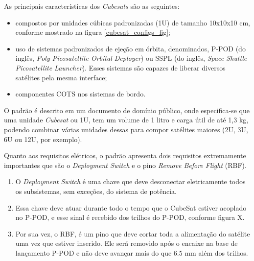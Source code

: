 As principais características dos \textit{Cubesats} são as seguintes:
\begin{itemize}
    \item compostos por unidades cúbicas padronizadas (1U) de tamanho 10x10x10 cm, conforme mostrado na figura \ref{cubesat_configs_fig};
    \item uso de sistemas padronizados de ejeção em órbita, denominados, P-POD (do inglês, \textit{Poly Picosatellite Orbital Deployer}) ou SSPL (do inglês, \textit{Space Shuttle Picosatellite Launcher}). Esses sistemas são capazes de liberar diversos satélites pela mesma interface;
    \item componentes COTS nos sistemas de bordo.
\end{itemize}

\noindent
\begin{minipage}{\linewidth}
\label{cubesat_configs_fig}
\end{minipage}

O padrão é descrito em um documento de domínio público\cite{cubesat_specs_rev13}, onde especifica-se que uma unidade \textit{Cubesat} ou 1U, tem um volume de 1 litro e carga útil de até 1,3 kg, podendo combinar várias unidades dessas para compor satélites maiores (2U, 3U, 6U ou 12U, por exemplo).

Quanto aos requisitos elétricos, o padrão apresenta dois requisitos extremamente importantes que são o \textit{Deployment Switch} e o pino \textit{Remove Before Flight} (RBF).
\begin{enumerate}
    \item O \textit{Deployment Switch} é uma chave que deve desconectar eletricamente todos os subsistemas, sem exceções, do sistema de potência.
    \item Essa chave deve atuar durante todo o tempo que o CubeSat estiver acoplado no P-POD, e esse sinal é recebido dos trilhos do P-POD, conforme figura X.
    \item Por sua vez, o RBF, é um pino que deve cortar toda a alimentação do satélite uma vez que estiver inserido. Ele será removido após o encaixe na base de lançamento P-POD e não deve avançar mais do que 6.5 mm além dos trilhos.
\end{enumerate}

